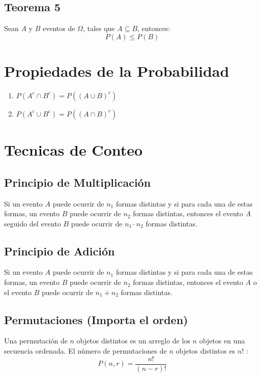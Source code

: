 \documentclass{templateNote}
\begin{document}
\subsection{Teorema 5}
\indent
Sean $A$ y $B$ eventos de $\Omega$, tales que $A \subseteq B$, entonces:
\begin{equation*}
    P(A) \leq P(B)
\end{equation*}
\section{Propiedades de la Probabilidad}
\begin{enumerate}
    \item $P(A^c \cap B^c) = P((A \cup B)^c)$
    \item $P(A^c \cup B^c) = P((A \cap B)^c)$
\end{enumerate}

\newpage
\section{Tecnicas de Conteo}
\subsection{Principio de Multiplicación}
\indent
Si un evento $A$ puede ocurrir de $n_1$ formas distintas y si para cada una de estas formas, un evento $B$ puede ocurrir de $n_2$ formas distintas, entonces el evento $A$ seguido del evento $B$ puede ocurrir de $n_1 \cdot n_2$ formas distintas.
\subsection{Principio de Adición}
\indent
Si un evento $A$ puede ocurrir de $n_1$ formas distintas y si para cada una de estas formas, un evento $B$ puede ocurrir de $n_2$ formas distintas, entonces el evento $A$ o el evento $B$ puede ocurrir de $n_1 + n_2$ formas distintas.

\subsection{Permutaciones (Importa el orden)}
\indent
Una permutación de $n$ objetos distintos es un arreglo de los $n$ objetos en una secuencia ordenada. El número de permutaciones de $n$ objetos distintos es $n!$ :
\begin{equation*}
    P(n, r) = \frac{n!}{(n - r)!}
\end{equation*}
\end{document}
